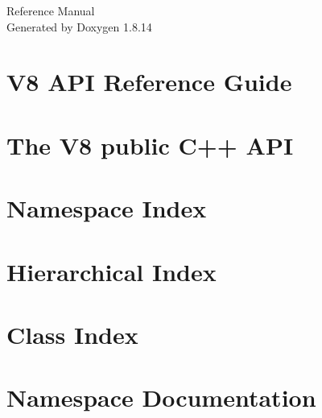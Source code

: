 \documentclass[twoside]{book}
\newcommand{\+}{\discretionary{\mbox{\scriptsize$\hookleftarrow$}}{}{}}
\newcommand{\clearemptydoublepage}{%
  \newpage{\pagestyle{empty}\cleardoublepage}%
}
\begin{document}
\hypersetup{pageanchor=false,
             bookmarksnumbered=true,
             pdfencoding=unicode
            }
\begin{titlepage}
\vspace*{7cm}
\begin{center}%
{\Large Reference Manual}\\
\vspace*{1cm}
{\large Generated by Doxygen 1.8.14}\\
\end{center}
\end{titlepage}
\clearemptydoublepage
{}
\tableofcontents
\clearemptydoublepage
{}
\hypersetup{pageanchor=true}

\chapter{V8 A\+PI Reference Guide}
\label{index}\hypertarget{index}{}
\chapter{The V8 public C++ A\+PI}
\label{md_v8_include_APIDesign}

\chapter{Namespace Index}

\chapter{Hierarchical Index}

\chapter{Class Index}

\chapter{Namespace Documentation}

\end{document}
